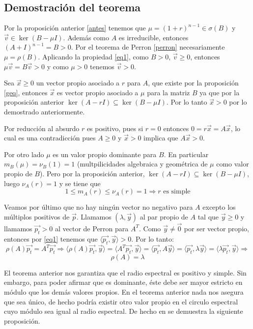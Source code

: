 \documentclass[size=a4, parskip=half, titlepage=false, toc=flat, toc=bib, 12pt, twoside]{scrartcl}
\makeatletter
\renewenvironment{proof}[1][\proofname] {\par\pushQED{\qed}\normalfont\topsep6\p@\@plus6\p@\relax\trivlist\item[\hskip\labelsep\itshape\tgpaella#1\@addpunct{.}]\ignorespaces}{\popQED\endtrivlist\@endpefalse}
\theoremstyle{theorem-style}
\theoremstyle{definition-style}
\theoremstyle{remark-style}
\theoremstyle{example-style}
\theoremstyle{definition-style}
\theoremstyle{remark-style}
\renewcommand{\proofname}{\normalfont\tgpaella\bfseries\small DEMOSTRACIÓN}
\makeatother
\begin{document}
\subsection{Demostración del teorema}
\begin{proof}
Por la proposición anterior \ref{antes} tenemos que $\mu = (1+ r)^{n-1} \in \sigma(B)$ y $\vec{v} \in \ker(B - \mu I)$. Además como $A$ es irreducible, entonces $(A + I)^{n-1} = B >0$. Por el teorema de Perron \ref{perron} necesariamente $\mu = \rho(B)$. Aplicando la propiedad \ref{eq1}, como $B > 0$, $\vec{v} \geq 0$, entonces $\mu \vec{v} = B \vec{v} > 0$ y como $\mu > 0$  tenemos $\vec{v} > 0$.

Sea $\vec{x} \geq 0$ un vector propio asociado a $r$ para $A$, que existe por la proposición \ref{geq}, entonces $\vec{x}$ es vector propio asociado a $\mu$ para la matriz $B$ ya que por la proposición anterior $\ker(A - rI) \subseteq \ker(B - \mu I)$. Por lo tanto $\vec{x} > 0$ por lo demostrado anteriormente.

Por reducción al absurdo $r$ es positivo, pues si $r = 0$ entonces $ 0 = r \vec{x} = A \vec{x}$, lo cual es una contradicción pues $A \geq 0$ y $\vec{x} > 0$ implica que $A\vec{x} > 0$.

Por otro lado $\mu$ es un valor propio dominante para $B$. En particular $m_B(\mu) = \nu_B (1) = 1$ (multpilicidades algebraica y geométrica de $\mu$ como valor propio de $B$). Pero por la proposición anterior, $\ker(A - r I) \subseteq \ker(B - \mu I)$, luego $\nu_A(r) = 1$ y se tiene que
$$1 \leq m_A(r) \leq \nu_A(r) = 1 \Rightarrow r \textrm{ es simple} $$

Veamos por último que no hay ningún vector no negativo para $A$ excepto los múltiplos positivos de $\vec{p}$. Llamamos $(\lambda, \vec{y})$ al par propio de $A$ tal que $\vec{y} \geq 0$ y llamamos $\vec{p_t} > 0$ al vector de Perron para $A^T$. Como $\vec{y} \neq \vec{0}$ por ser vector propio, entonces por \ref{eq1} tenemos que $\langle \vec{p_t}, \vec{y} \rangle> 0$. Por lo tanto:
$$\rho(A)\vec{p_t} = A^T \vec{p_t} \Rightarrow \langle \rho(A)\vec{p_t}, \vec{y} \rangle = \langle A^T \vec{p_t}, \vec{y} \rangle = \langle \vec{p_t}, A \vec{y} \rangle = \langle \vec{p_t} , \lambda \vec{y} \rangle = \langle \lambda \vec{p_t}, \vec{y}\rangle  \Rightarrow $$ $$\rho(A) = \lambda $$

\end{proof}

El teorema anterior nos garantiza que el radio espectral es positivo y simple. Sin embargo, para poder afirmar que es dominante, éste debe ser mayor estricto en módulo que los demás valores propios. En el teorema anterior nada nos asegura que sea único, de hecho podría existir otro valor propio en el circulo espectral cuyo módulo sea igual al radio espectral. De hecho en \cite{algebralineal}
se demuestra la siguiente proposición.
\end{document}
